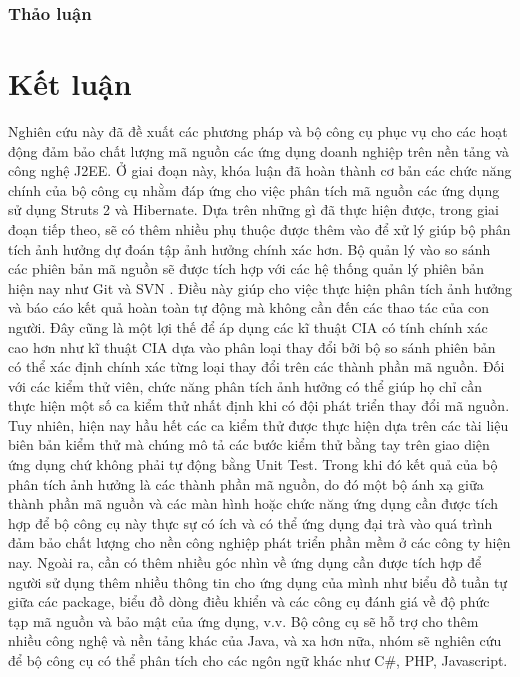 \documentclass[12pt]{report}
\begin{document}
\subsection{Thảo luận}

\chapter{Kết luận}
\label{chap:conclusion}
Nghiên cứu này đã đề xuất các phương pháp và bộ công cụ phục vụ cho các hoạt động đảm bảo chất lượng mã nguồn các ứng dụng doanh nghiệp trên nền tảng và công nghệ J2EE. Ở giai đoạn này, khóa luận đã hoàn thành cơ bản các chức năng chính của bộ công cụ nhằm đáp ứng cho việc phân tích mã nguồn các ứng dụng sử dụng Struts 2 và Hibernate. Dựa trên những gì đã thực hiện được, trong giai đoạn tiếp theo, sẽ có thêm nhiều phụ thuộc được thêm vào để xử lý giúp bộ phân tích ảnh hưởng dự đoán tập ảnh hưởng chính xác hơn. Bộ quản lý vào so sánh các phiên bản mã nguồn sẽ được tích hợp với các hệ thống quản lý phiên bản hiện nay như Git  và SVN . Điều này giúp cho việc thực hiện phân tích ảnh hưởng và báo cáo kết quả hoàn toàn tự động mà không cần đến các thao tác của con người. Đây cũng là một lợi thế để áp dụng các kĩ thuật CIA có tính chính xác cao hơn như kĩ thuật CIA dựa vào phân loại thay đổi bởi bộ so sánh phiên bản có thể xác định chính xác từng loại thay đổi trên các thành phần mã nguồn. Đối với các kiểm thử viên, chức năng phân tích ảnh hưởng có thể giúp họ chỉ cần thực hiện một số ca kiểm thử nhất định khi có đội phát triển thay đổi mã nguồn. Tuy nhiên, hiện nay hầu hết các ca kiểm thử được thực hiện dựa trên các tài liệu biên bản kiểm thử mà chúng mô tả các bước kiểm thử bằng tay trên giao diện ứng dụng chứ không phải tự động bằng Unit Test. Trong khi đó kết quả của bộ phân tích ảnh hưởng là các thành phần mã nguồn, do đó một bộ ánh xạ giữa thành phần mã nguồn và các màn hình hoặc chức năng ứng dụng cần được tích hợp để bộ công cụ này thực sự có ích và có thể ứng dụng đại trà vào quá trình đảm bảo chất lượng cho nền công nghiệp phát triển phần mềm ở các công ty hiện nay. Ngoài ra, cần có thêm nhiều góc nhìn về ứng dụng cần được tích hợp để người sử dụng thêm nhiều thông tin cho ứng dụng của mình như biểu đồ tuần tự giữa các package, biểu đồ dòng điều khiển và các công cụ đánh giá về độ phức tạp mã nguồn và bảo mật của ứng dụng, v.v. Bộ công cụ sẽ hỗ trợ cho thêm nhiều công nghệ và nền tảng khác của Java, và xa hơn nữa, nhóm sẽ nghiên cứu để bộ công cụ có thể phân tích cho các ngôn ngữ khác như C\#, PHP, Javascript.
\end{document}
